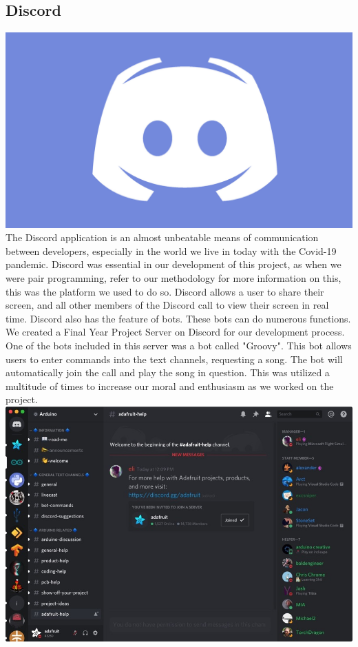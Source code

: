 \subsection{Discord}
\includegraphics[scale=0.15]{img/discord-logo.jpg} \newline
The Discord application is an almost unbeatable means of communication between developers, especially in the world we live in today with the Covid-19 pandemic. Discord was essential in our development of this project, as when we were pair programming, refer to our methodology for more information on this, this was the platform we used to do so. Discord allows a user to share their screen, and all other members of the Discord call to view their screen in real time. Discord also has the feature of bots. These bots can do numerous functions. We created a Final Year Project Server on Discord for our development process. One of the bots included in this server was a bot called "Groovy". This bot allows users to enter commands into the text channels, requesting a song. The bot will automatically join the call and play the song in question. This was utilized a multitude of times to increase our moral and enthusiasm as we worked on the project. \newline
\includegraphics[scale=0.5]{img/server.jpg}
\newline

